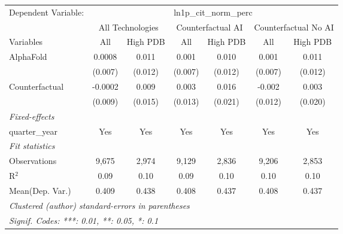 \begingroup
\centering
\begin{tabular}{lcccccc}
   \tabularnewline \midrule \midrule
   Dependent Variable: & \multicolumn{6}{c}{ln1p\_cit\_norm\_perc}\\
 & \multicolumn{2}{c}{All Technologies} & \multicolumn{2}{c}{Counterfactual AI} & \multicolumn{2}{c}{Counterfactual No AI} \\
\cmidrule(lr){1-1}\cmidrule(lr){2-3} \cmidrule(lr){4-5} \cmidrule(lr){6-7}
Variables & \multicolumn{1}{c}{All} & \multicolumn{1}{c}{High PDB} & \multicolumn{1}{c}{All} & \multicolumn{1}{c}{High PDB} & \multicolumn{1}{c}{All} & \multicolumn{1}{c}{High PDB} \\
\cmidrule(lr){1-1}\cmidrule(lr){2-2} \cmidrule(lr){3-3} \cmidrule(lr){4-4} \cmidrule(lr){5-5} \cmidrule(lr){6-6} \cmidrule(lr){7-7}
   AlphaFold      & 0.0008  & 0.011   & 0.001   & 0.010   & 0.001   & 0.011\\   
                  & (0.007) & (0.012) & (0.007) & (0.012) & (0.007) & (0.012)\\   
   Counterfactual & -0.0002 & 0.009   & 0.003   & 0.016   & -0.002  & 0.003\\   
                  & (0.009) & (0.015) & (0.013) & (0.021) & (0.012) & (0.020)\\   
   \midrule
   \emph{Fixed-effects}\\
   quarter\_year  & Yes     & Yes     & Yes     & Yes     & Yes     & Yes\\  
   \midrule
   \emph{Fit statistics}\\
   Observations   & 9,675   & 2,974   & 9,129   & 2,836   & 9,206   & 2,853\\  
   R$^2$          & 0.09    & 0.10    & 0.09    & 0.10    & 0.10    & 0.10\\  
Mean(Dep. Var.) & 0.409 & 0.438 & 0.408 & 0.437 & 0.408 & 0.437 \\
   \midrule \midrule
   \multicolumn{7}{l}{\emph{Clustered (author) standard-errors in parentheses}}\\
   \multicolumn{7}{l}{\emph{Signif. Codes: ***: 0.01, **: 0.05, *: 0.1}}\\
\end{tabular}
\par\endgroup
